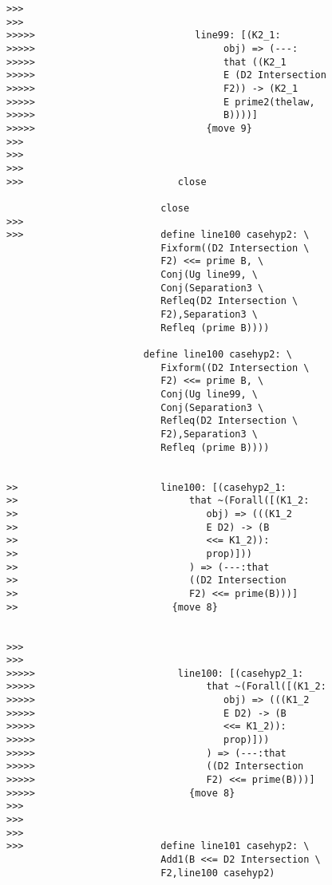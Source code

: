 \documentclass[12pt]{article}
\begin{document}
\begin{verbatim}
>>>
>>>
>>>>>                            line99: [(K2_1:
>>>>>                                 obj) => (---:
>>>>>                                 that ((K2_1
>>>>>                                 E (D2 Intersection
>>>>>                                 F2)) -> (K2_1
>>>>>                                 E prime2(thelaw,
>>>>>                                 B))))]
>>>>>                              {move 9}
>>>
>>>
>>>
>>>                           close

                           close
>>>
>>>                        define line100 casehyp2: \
                           Fixform((D2 Intersection \
                           F2) <<= prime B, \
                           Conj(Ug line99, \
                           Conj(Separation3 \
                           Refleq(D2 Intersection \
                           F2),Separation3 \
                           Refleq (prime B))))

                        define line100 casehyp2: \
                           Fixform((D2 Intersection \
                           F2) <<= prime B, \
                           Conj(Ug line99, \
                           Conj(Separation3 \
                           Refleq(D2 Intersection \
                           F2),Separation3 \
                           Refleq (prime B))))


>>                         line100: [(casehyp2_1:
>>                              that ~(Forall([(K1_2:
>>                                 obj) => (((K1_2
>>                                 E D2) -> (B
>>                                 <<= K1_2)):
>>                                 prop)]))
>>                              ) => (---:that
>>                              ((D2 Intersection
>>                              F2) <<= prime(B)))]
>>                           {move 8}


>>>
>>>
>>>>>                         line100: [(casehyp2_1:
>>>>>                              that ~(Forall([(K1_2:
>>>>>                                 obj) => (((K1_2
>>>>>                                 E D2) -> (B
>>>>>                                 <<= K1_2)):
>>>>>                                 prop)]))
>>>>>                              ) => (---:that
>>>>>                              ((D2 Intersection
>>>>>                              F2) <<= prime(B)))]
>>>>>                           {move 8}
>>>
>>>
>>>
>>>                        define line101 casehyp2: \
                           Add1(B <<= D2 Intersection \
                           F2,line100 casehyp2)


\end{verbatim}
\end{document}
